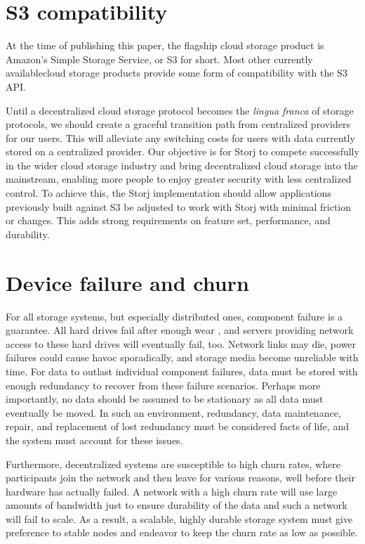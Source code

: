 \documentclass[11pt,fleqn,openany]{book}
\begin{document}
\section{S3 compatibility}

At the time of publishing this paper, the flagship cloud storage product is
Amazon's Simple Storage Service, or S3 for
short. Most other currently availablecloud storage products provide some form
of compatibility with the S3 API.

Until a decentralized cloud storage protocol becomes the {\em lingua franca} of
storage protocols, we should create a graceful transition path from centralized
providers for our users.
This will alleviate any switching costs for users with data currently stored on
a centralized provider. Our objective is for Storj to compete successfully in
the wider cloud storage
industry and bring decentralized cloud storage into the mainstream, enabling
more people to enjoy greater security with less centralized control.
To achieve this, the Storj implementation should allow
applications previously built against S3 be adjusted to work with Storj with
minimal friction or changes.
This adds strong requirements on feature set, performance, and durability.

\section{Device failure and churn}

For all storage systems, but especially distributed ones, component
failure is a guarantee. All hard drives fail after enough wear
\cite{backblaze-hd-2018-q1}, and servers providing network access to
these hard drives will eventually fail, too. Network links may die, power
failures could cause havoc sporadically,
and storage media become unreliable with time.
For data to outlast individual component
failures, data must be stored with enough redundancy to recover from these
failure scenarios.
Perhaps more importantly, no data should be assumed to be stationary as all
data must eventually be moved. In such an environment, redundancy, data
maintenance, repair, and replacement of lost redundancy must be considered
facts of life, and the system must account for these issues.

Furthermore, decentralized systems are susceptible to high churn rates, where
participants join the network and then leave for various reasons, well
before their hardware has actually failed. A network with a high churn rate will
use large amounts of bandwidth just to ensure durability of the data and such
a network will fail to scale. As a result, a scalable, highly durable storage
system must give preference to stable nodes and endeavor to keep the churn rate
as low as possible.
\end{document}
